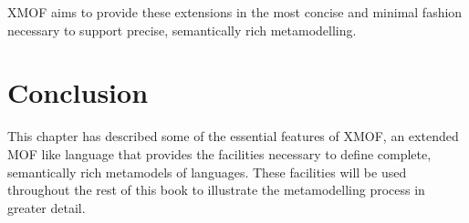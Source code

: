 XMOF aims to provide these extensions in the most concise and
minimal fashion necessary to support precise, semantically rich
metamodelling.

\section{Conclusion}

This chapter has described some of the essential features of XMOF,
an extended MOF like language that provides the facilities
necessary to define complete, semantically rich metamodels of
languages. These facilities will be used throughout the rest of
this book to illustrate the metamodelling process in greater
detail.
